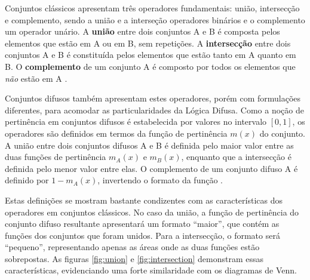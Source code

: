 \documentclass[12pt]{article}
\begin{document}
Conjuntos clássicos apresentam três operadores fundamentais: união, intersecção e complemento, sendo a união e a interseção operadores binários e o complemento um operador unário. A \textbf{união} entre dois conjuntos A e B é composta pelos elementos que estão em A ou em B, sem repetições. A \textbf{intersecção} entre dois conjuntos A e B é constituída pelos elementos que estão tanto em A quanto em B. O \textbf{complemento} de um conjunto A é composto por todos os elementos que \textit{não} estão em A \cite{Houston2009}.

Conjuntos difusos também apresentam estes operadores, porém com formulações diferentes, para acomodar as particularidades da Lógica Difusa. Como a noção de pertinência em conjuntos difusos é estabelecida por valores no intervalo $[0, 1]$, os operadores são definidos em termos da função de pertinência $m(x)$ do conjunto. A união entre dois conjuntos difusos A e B é definida pelo maior valor entre as duas funções de pertinência $m_{A}(x)$ e $m_{B}(x)$, enquanto que a intersecção é definida pelo menor valor entre elas. O complemento de um conjunto difuso A é definido por $1 - m_{A}(x)$, invertendo o formato da função \cite{Zadeh1965}.

Estas definições se mostram bastante condizentes com as características dos operadores em conjuntos clássicos. No caso da união, a função de pertinência do conjunto difuso resultante apresentará um formato ``maior'', que contém as funções dos conjuntos que foram unidos. Para a intersecção, o formato será ``pequeno'', representando apenas as áreas onde as duas funções estão sobrepostas. As figuras \ref{fig:union} e \ref{fig:intersection} demonstram essas características, evidenciando uma forte similaridade com os diagramas de Venn.
\end{document}
